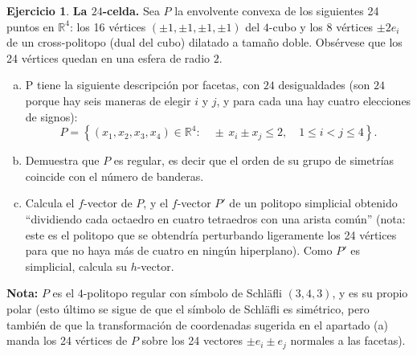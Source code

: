 \documentclass[10pt]{article}
\theoremstyle{definition}
\newtheorem{ejer}{Ejercicio}
\newcommand{\R}{\mathbb{R}}
\begin{document}
\begin{ejer}\textbf{La $24$-celda.} Sea $P$ la envolvente convexa de los siguientes 24 puntos en $\R^4$: los 16 vértices $(\pm 1, \pm 1, \pm 1, \pm 1)$ del $4$-cubo y los 8 vértices $\pm 2 e_i$ de un cross-politopo (dual del cubo) dilatado a tamaño doble. Obsérvese que los 24 vértices quedan en una esfera de radio $2$.
\begin{enumerate}[(a)]
\item P tiene la siguiente descripción por facetas, con $24$ desigualdades (son $24$ porque hay seis maneras de elegir $i$ y $j$, y para cada una hay cuatro elecciones de signos):%
\[
P = \left\{(x_1,x_2,x_3,x_4) \in \R^4 : \quad \pm \, x_i \pm x_j \le 2, \quad 1\le i < j \le 4 \right\}.
\]

\item Demuestra que $P$ es regular, es decir que el orden de su grupo de simetrías coincide con el número de banderas.%

\item Calcula el $f$-vector de $P$, y el $f$-vector $P'$ de un politopo simplicial obtenido ``dividiendo cada octaedro en cuatro tetraedros con una arista común'' (nota: este es el politopo que se obtendría perturbando ligeramente los 24 vértices para que no haya más de cuatro en ningún hiperplano). Como $P'$ es simplicial, calcula su $h$-vector.

\end{enumerate}
\small {\bf Nota:}  $P$ es el $4$-politopo regular con símbolo de Schl\"afli $(3,4,3)$, y es su propio polar (esto último se sigue de que el símbolo de Schl\"afli es simétrico, pero también de que la transformación de coordenadas sugerida en el apartado (a) manda los 24 vértices de $P$ sobre los 24 vectores $\pm e_i \pm e_j$ normales a las facetas).
\end{ejer}
\end{document}
